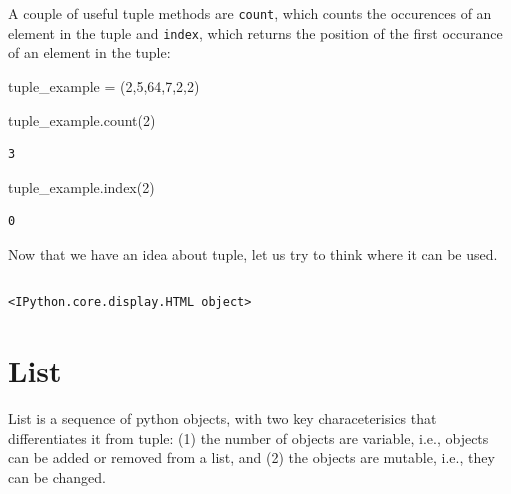 \documentclass[
  letterpaper,
  DIV=11,
  numbers=noendperiod]{scrreprt}
\newenvironment{Shaded}{\begin{snugshade}}{\end{snugshade}}
\newcommand{\DecValTok}[1]{\textcolor[rgb]{0.68,0.00,0.00}{#1}}
\newcommand{\NormalTok}[1]{\textcolor[rgb]{0.00,0.23,0.31}{#1}}
\newcommand{\OperatorTok}[1]{\textcolor[rgb]{0.37,0.37,0.37}{#1}}
\begin{document}
A couple of useful tuple methods are \texttt{count}, which counts the
occurences of an element in the tuple and \texttt{index}, which returns
the position of the first occurance of an element in the tuple:

\begin{Shaded}
\begin{Highlighting}[]
\NormalTok{tuple\_example }\OperatorTok{=}\NormalTok{ (}\DecValTok{2}\NormalTok{,}\DecValTok{5}\NormalTok{,}\DecValTok{64}\NormalTok{,}\DecValTok{7}\NormalTok{,}\DecValTok{2}\NormalTok{,}\DecValTok{2}\NormalTok{)}
\end{Highlighting}
\end{Shaded}

\begin{Shaded}
\begin{Highlighting}[]
\NormalTok{tuple\_example.count(}\DecValTok{2}\NormalTok{)}
\end{Highlighting}
\end{Shaded}

\begin{verbatim}
3
\end{verbatim}

\begin{Shaded}
\begin{Highlighting}[]
\NormalTok{tuple\_example.index(}\DecValTok{2}\NormalTok{)}
\end{Highlighting}
\end{Shaded}

\begin{verbatim}
0
\end{verbatim}

Now that we have an idea about tuple, let us try to think where it can
be used.

\begin{verbatim}
\end{verbatim}

\begin{verbatim}
<IPython.core.display.HTML object>
\end{verbatim}

\hypertarget{list}{%
\section{List}\label{list}}

List is a sequence of python objects, with two key characeterisics that
differentiates it from tuple: (1) the number of objects are variable,
i.e., objects can be added or removed from a list, and (2) the objects
are mutable, i.e., they can be changed.
\end{document}
